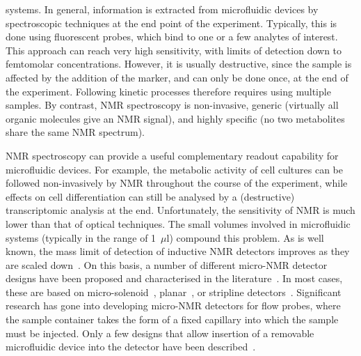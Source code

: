\documentclass[preprint,5p]{elsarticle}
\begin{document}
systems. In general, information is extracted from microfluidic devices by spectroscopic 
techniques at the end point of the experiment. Typically, 
this is done using fluorescent probes, which bind to one or a few analytes of interest. 
This approach can reach very high sensitivity, with limits of detection down to 
femtomolar concentrations. However, it is usually destructive, since the sample is 
affected by the addition of the marker, and can only be done once, at the end of the 
experiment. Following kinetic processes therefore requires using multiple samples. By 
contrast, NMR spectroscopy is non-invasive, generic (virtually all organic 
molecules give an NMR signal), and highly specific (no two metabolites share 
the same NMR spectrum).

NMR spectroscopy can provide a useful complementary readout capability 
for microfluidic devices. For example, the metabolic activity of cell cultures 
can be followed non-invasively by NMR throughout the course of the experiment, 
while effects on cell differentiation can still be analysed by a (destructive) 
transcriptomic analysis at the end. Unfortunately, the sensitivity 
of NMR is much lower than that of optical techniques. 
The small volumes involved in microfluidic systems
 (typically in the range of 1~$\mu$l) 
compound this problem. As is well known, the mass limit of detection of 
inductive NMR detectors improves as they are scaled down~\cite{Olson1995}. 
On this basis, a number of different micro-NMR detector designs have been 
proposed and characterised in the literature~\cite{utz2012review,micronmr2014review}. 
In most cases, these are based on micro-solenoid~\cite{SUBRAMANIAN1998,Pines2007}, 
planar~\cite{Maguire2007,dieter2008,EHRMANN200}, or stripline 
detectors~\cite{stripline_jan}. 
Significant research has gone into developing micro-NMR detectors for flow probes, 
where the sample container takes the form of a fixed capillary into which the sample
must be injected. Only a few designs that allow insertion of a removable microfluidic 
device into the detector have been described~\cite{Spengler-2014,Spengler-2016,gream_2016}.
\end{document}
